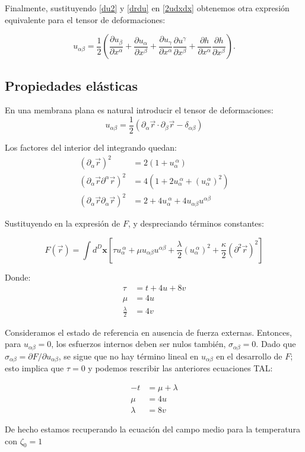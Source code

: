 Finalmente, sustituyendo \eqref{du2} y \eqref{drdu} en \eqref{2udxdx}
obtenemos otra expresión equivalente para el tensor de deformaciones:

\begin{equation*}
u_{\alpha\beta}=\frac{1}{2}\left(
 \frac{\partial u_{\beta}}{\partial x^{\alpha}}+
 \frac{\partial u_{\alpha}}{\partial x^{\beta}}+
 \frac{\partial u_{\gamma}}{\partial x^{\alpha}}
\frac{\partial u^{\gamma}}{\partial x^{\beta}}+
\frac{\partial h}{\partial  x^{\alpha}}\frac{\partial h}{\partial x^{\beta}}\right).
\end{equation*}

\subsection{Propiedades elásticas}

En una membrana plana es natural introducir el tensor de deformaciones:
\begin{equation*}
u_{\alpha\beta}=\frac{1}{2}(\partial_{\alpha}\vec{r}\cdot\partial_{\beta}\vec{r}-\delta_{\alpha\beta})
\end{equation*}

Los factores del interior del integrando quedan:
\begin{align}
(\partial_{\alpha}\vec{r})^2&=2(1+u_{\alpha}^{\ \alpha})\\
(\partial_{\alpha}\vec{r}\partial^{\alpha}\vec{r})^2&=4(1+2u_{\alpha}^{\
  \alpha}+(u_{\alpha}^{\ \alpha})^2)\\
(\partial_{\alpha}\vec{r}\partial_{\alpha}\vec{r})^2&=2+4u_{\alpha}^{\
  \alpha}+4u_{\alpha\beta}u^{\alpha\beta}
\end{align}

Sustituyendo en la expresión de $F$, y despreciando términos constantes:

\begin{equation*}
F(\vec{r})=\int d^D\mathbf{x}
\left[\tau u_{\alpha}^{\ \alpha}+
\mu u_{\alpha\beta}u^{\alpha\beta} +
\frac{\lambda}{2}(u_{\alpha}^{\ \alpha})^2 +
\frac{\kappa}{2}(\partial^2\vec{r})^2\right]
\end{equation*}

Donde:
\begin{align}
\tau&=t+4u+8v\\
\mu&=4u\\
\frac{\lambda}{2}&=4v
\end{align}

Consideramos el estado de referencia en ausencia de fuerza externas. Entonces,
para $u_{\alpha\beta}=0$, los esfuerzos internos deben ser nulos también,
$\sigma_{\alpha\beta}=0$. Dado que $\sigma_{\alpha\beta}=\partial F / \partial
u_{\alpha\beta}$, se sigue que no hay término lineal en $u_{\alpha\beta}$ en
el desarrollo de $F$; esto implica que $\tau=0$ y podemos rescribir las
anteriores ecuaciones TAL:

\begin{align}
-t&=\mu+\lambda\\
\mu&=4u\\
\lambda&=8v
\end{align}   

De hecho estamos recuperando la ecuación del campo medio para la temperatura
con $\zeta_0=1$




